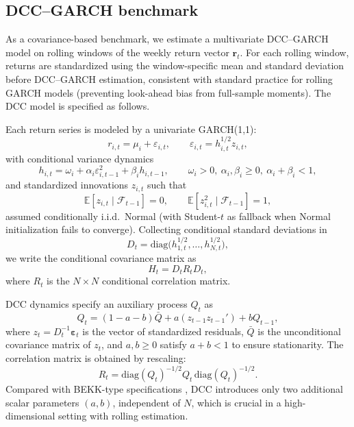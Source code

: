\subsection{DCC--GARCH benchmark}\label{subsec:dcc}

As a covariance-based benchmark, we estimate a multivariate DCC--GARCH model on rolling
windows of the weekly return vector $\mathbf{r}_t$. For each rolling window, returns are
standardized using the window-specific mean and standard deviation before DCC--GARCH
estimation, consistent with standard practice for rolling GARCH models (preventing
look-ahead bias from full-sample moments). The DCC model is specified as follows.

Each return series is modeled by a univariate GARCH(1,1):
\begin{equation}
  r_{i,t} = \mu_i + \varepsilon_{i,t}, \qquad
  \varepsilon_{i,t} = h_{i,t}^{1/2} z_{i,t},
\end{equation}
with conditional variance dynamics
\begin{equation}
  h_{i,t}
  = \omega_i + \alpha_i \varepsilon_{i,t-1}^2 + \beta_i h_{i,t-1},
  \qquad \omega_i > 0,\ \alpha_i,\beta_i \ge 0,\ \alpha_i + \beta_i < 1,
\end{equation}
and standardized innovations $z_{i,t}$ such that
\[
  \mathbb{E}[z_{i,t} \mid \mathcal{F}_{t-1}] = 0, \qquad
  \mathbb{E}[z_{i,t}^2 \mid \mathcal{F}_{t-1}] = 1,
\]
assumed conditionally i.i.d.\ Normal (with Student-$t$ as fallback when Normal
initialization fails to converge). Collecting conditional standard deviations in
\[
  D_t = \mathrm{diag}\big(h_{1,t}^{1/2},\dots,h_{N,t}^{1/2}\big),
\]
we write the conditional covariance matrix as
\begin{equation}
  H_t = D_t R_t D_t,
\end{equation}
where $R_t$ is the $N \times N$ conditional correlation matrix.

DCC dynamics \citep{Engle2002DCC} specify an auxiliary process $Q_t$ as
\begin{equation}
  Q_t = (1 - a - b)\bar{Q} + a (z_{t-1} z_{t-1}') + b Q_{t-1},
\end{equation}
where $z_t = D_t^{-1} \boldsymbol{\varepsilon}_t$ is the vector of standardized
residuals, $\bar{Q}$ is the unconditional covariance matrix of $z_t$, and $a,b \ge 0$
satisfy $a + b < 1$ to ensure stationarity. The correlation matrix is obtained by
rescaling:
\begin{equation}
  R_t = \mathrm{diag}(Q_t)^{-1/2} Q_t \,\mathrm{diag}(Q_t)^{-1/2}.
\end{equation}
Compared with BEKK-type specifications \citep{EngleKroner1995}, DCC introduces only two
additional scalar parameters $(a,b)$, independent of $N$, which is crucial in a
high-dimensional setting with rolling estimation.

